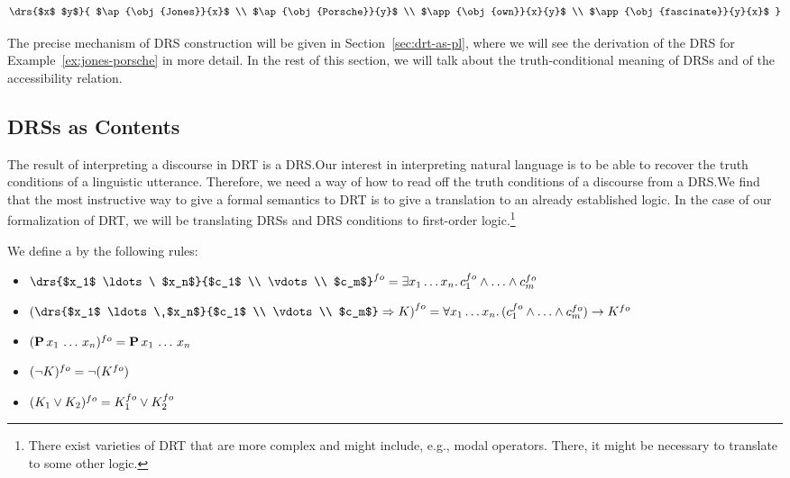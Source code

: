 $$
\drs{$x$ $y$}{
  $\ap{\obj{Jones}}{x}$ \\
  $\ap{\obj{Porsche}}{y}$ \\
  $\app{\obj{own}}{x}{y}$ \\
  $\app{\obj{fascinate}}{y}{x}$
}
$$

The precise mechanism of DRS construction will be given in
Section~\ref{sec:drt-as-pl}, where we will see the derivation of the DRS
for Example~\ref{ex:jones-porsche} in more detail. In the rest of this
section, we will talk about the truth-conditional meaning of DRSs and of
the accessibility relation.


\subsection{DRSs as Contents}
\label{ssec:drt-content}

The result of interpreting a discourse in DRT is a DRS.\@ Our interest in
interpreting natural language is to be able to recover the truth conditions
of a linguistic utterance. Therefore, we need a way of how to read off the
truth conditions of a discourse from a DRS.\@ We find that the most
instructive way to give a formal semantics to DRT is to give a translation
to an already established logic. In the case of our formalization of DRT,
we will be translating DRSs and DRS conditions to first-order
logic.\footnote{There exist varieties of DRT that are more complex and
  might include, e.g., modal operators. There, it might be necessary to
  translate to some other logic.}

\begin{definition}
  We define a  by the following rules:

  \begin{itemize}
  \item $\fo{\drs{$x_1$ \ldots\ $x_n$}{$c_1$ \\ \vdots \\ $c_m$}}
  = \exists x_1 \ldots x_n.\, \fo{c_1} \land \ldots \land \fo{c_m}$
  \item $\fo{\left(\drs{$x_1$ \ldots\ $x_n$}{$c_1$ \\ \vdots \\ $c_m$} \Rightarrow K\right)}
  = \forall x_1 \ldots x_n.\, (\fo{c_1} \land \ldots \land \fo{c_m}) \to \fo{K}$
  \item $(\textbf{P}\,x_1\,\ldots\,x_n)^{fo} = \textbf{P}\,x_1\,\ldots\,x_n$
  \item $(\lnot K)^{fo} = \lnot (K^{fo})$
  \item $(K_1 \lor K_2)^{fo} = K_1^{fo} \lor K_2^{fo}$
  \end{itemize}
\end{definition}

